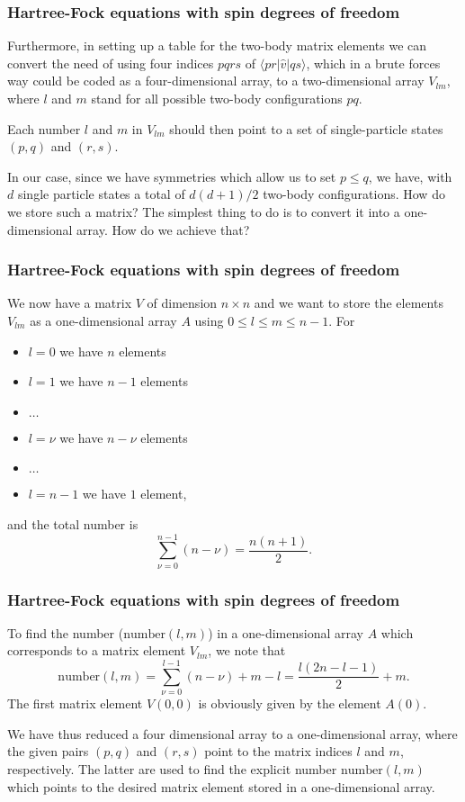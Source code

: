 \frame
{
  \frametitle{Hartree-Fock equations with spin degrees of freedom}
\begin{small}
{\scriptsize
Furthermore, in setting up a table for the two-body matrix elements we can convert the need of using four indices $pqrs$ of 
$\langle pr | \hat{v}|qs\rangle$, which in a brute forces way could be coded as a four-dimensional array, to 
a two-dimensional array $V_{lm}$, where $l$ and $m$ stand for all possible two-body configurations $pq$.
 
Each number $l$ and $m$ in $V_{lm}$  should then point to a set of single-particle  states $(p,q)$ and $(r,s)$.  

In our case, since we have 
symmetries which allow us to set $p\le q$, we have, with $d$ single particle states a total of $d(d+1)/2$ two-body configurations.
How do we store such a matrix? The simplest thing to do is to convert it into a one-dimensional array. How do we achieve that? 
}
\end{small}
}







\frame
{
  \frametitle{Hartree-Fock equations with spin degrees of freedom}
\begin{small}
{\scriptsize
We now have a matrix $V$ of dimension $n\times n$ and we want to store the elements $V_{lm}$ as a one-dimensional array $A$ using
$0 \le l \le m \le n-1$. For
\begin{itemize}
\item $l=0$ we have $n$ elements
\item $l=1$ we have $n-1$ elements
\item $\dots$
\item $l=\nu$ we have $n-\nu$ elements
\item $\dots$
\item $l=n-1$ we have $1$ element,
\end{itemize}  
and the total number is  
\[
\sum_{\nu =0}^{n-1}\left(n-\nu\right)=\frac{n(n+1)}{2}.
\] 
}
\end{small}
}



\frame
{
  \frametitle{Hartree-Fock equations with spin degrees of freedom}
\begin{small}
{\scriptsize
To find the number ($\mathrm{number}(l,m)$) in a one-dimensional array $A$ which corresponds to a matrix element $V_{lm}$, we note that
\[
\mathrm{number}(l,m)=\sum_{\nu =0}^{l-1}\left(n-\nu\right)+m-l=\frac{l(2n-l-1)}{2}+m.
\] 
The first matrix element $V(0,0)$ is obviously given by the element $A(0)$. 

We have thus reduced a four dimensional array to a one-dimensional array, where the given pairs $(p,q)$ and $(r,s)$ point to the matrix indices $l$
and $m$, respectively. The latter are used to find the explicit number $\mathrm{number}(l,m)$ which points to the desired matrix element stored 
in a one-dimensional array.
}
\end{small}
}



